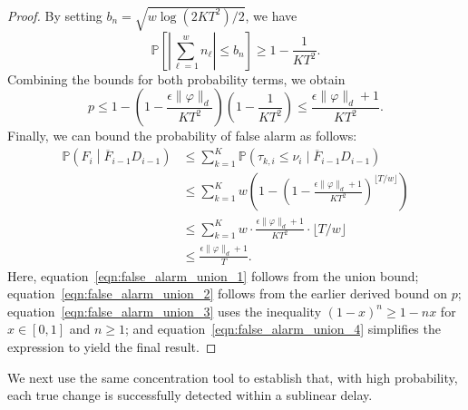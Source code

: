 \documentclass[twoside]{article}
\def\eqref#1{equation~\ref{#1}}
\theoremstyle{plain}
\theoremstyle{definition}
\theoremstyle{remark}
\begin{document}
\begin{proof}
By setting $b_{n}=\sqrt{w\log\left(2KT^2\right)/2}$, we have
\begin{equation}
    \mathbb{P}\left[\left\lvert 
    \sum_{\ell = 1}^{w} n_{\ell} 
    \right\rvert \leq b_n \right]
    \geq 1 - \frac{1}{KT^2}.  \label{eqn:n_bound}
\end{equation}
Combining the bounds for both probability terms, we obtain
\begin{equation}
    p
    \leq 1 - \left(1 - \frac{\epsilon \lVert \varphi \rVert_{d}}{KT^2}\right) \left(1 - \frac{1}{KT^2}\right)
    \leq \frac{\epsilon \lVert \varphi \rVert_{d} + 1}{KT^2}.
\end{equation}
Finally, we can bound the probability of false alarm as follows:
\begin{subequations}
    \begin{align}
        \mathbb{P}\left(F_i \middle| \overline{F}_{i-1} D_{i-1}\right) &\leq \sum_{k=1}^{K} \mathbb{P}\left(\tau_{k,i} \leq \nu_i \mid \overline{F}_{i-1} D_{i-1}\right)\label{eqn:false_alarm_union_1}\\
        &\leq \sum_{k=1}^{K} w\left(1-\left(1-\frac{\epsilon \lVert \varphi \rVert_{d} + 1}{KT^2}\right)^{\lfloor T / w\rfloor}\right)\label{eqn:false_alarm_union_2}\\
        &\leq \sum_{k=1}^{K} w \cdot \frac{\epsilon \lVert \varphi \rVert_{d} + 1}{KT^2} \cdot \lfloor T / w\rfloor\label{eqn:false_alarm_union_3}\\
        &\leq \frac{\epsilon \lVert \varphi \rVert_{d} + 1}{T}.\label{eqn:false_alarm_union_4}
    \end{align}
\end{subequations}
Here, \eqref{eqn:false_alarm_union_1} follows from the union bound; \eqref{eqn:false_alarm_union_2} follows from the earlier derived bound on \( p \); \eqref{eqn:false_alarm_union_3} uses the inequality \( (1 - x)^n \geq 1 - nx \) for \( x \in [0,1] \) and \( n \geq 1 \); and \eqref{eqn:false_alarm_union_4} simplifies the expression to yield the final result.
\end{proof}

We next use the same concentration tool to establish that, with high probability, each true change is successfully detected within a sublinear delay. 
\end{document}
